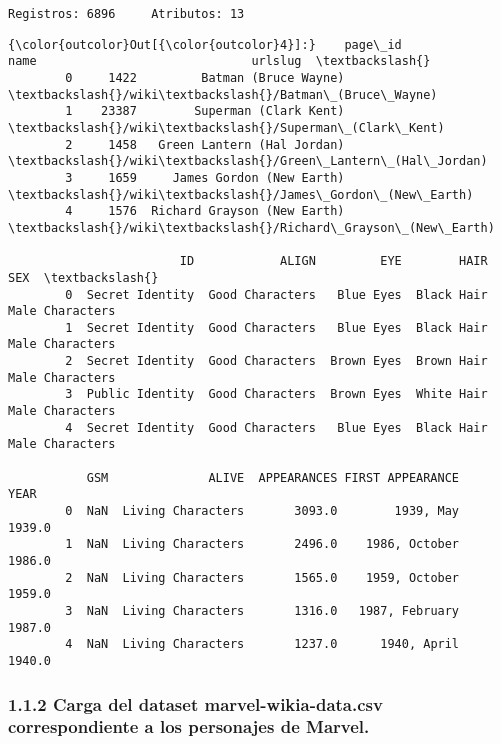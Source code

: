 \documentclass[11pt]{article}
\begin{document}
    \begin{Verbatim}[commandchars=\\\{\}]
Registros: 6896     Atributos: 13

    \end{Verbatim}

\begin{Verbatim}[commandchars=\\\{\}]
{\color{outcolor}Out[{\color{outcolor}4}]:}    page\_id                         name                              urlslug  \textbackslash{}
        0     1422         Batman (Bruce Wayne)         \textbackslash{}/wiki\textbackslash{}/Batman\_(Bruce\_Wayne)   
        1    23387        Superman (Clark Kent)        \textbackslash{}/wiki\textbackslash{}/Superman\_(Clark\_Kent)   
        2     1458   Green Lantern (Hal Jordan)   \textbackslash{}/wiki\textbackslash{}/Green\_Lantern\_(Hal\_Jordan)   
        3     1659     James Gordon (New Earth)     \textbackslash{}/wiki\textbackslash{}/James\_Gordon\_(New\_Earth)   
        4     1576  Richard Grayson (New Earth)  \textbackslash{}/wiki\textbackslash{}/Richard\_Grayson\_(New\_Earth)   
        
                        ID            ALIGN         EYE        HAIR              SEX  \textbackslash{}
        0  Secret Identity  Good Characters   Blue Eyes  Black Hair  Male Characters   
        1  Secret Identity  Good Characters   Blue Eyes  Black Hair  Male Characters   
        2  Secret Identity  Good Characters  Brown Eyes  Brown Hair  Male Characters   
        3  Public Identity  Good Characters  Brown Eyes  White Hair  Male Characters   
        4  Secret Identity  Good Characters   Blue Eyes  Black Hair  Male Characters   
        
           GSM              ALIVE  APPEARANCES FIRST APPEARANCE    YEAR  
        0  NaN  Living Characters       3093.0        1939, May  1939.0  
        1  NaN  Living Characters       2496.0    1986, October  1986.0  
        2  NaN  Living Characters       1565.0    1959, October  1959.0  
        3  NaN  Living Characters       1316.0   1987, February  1987.0  
        4  NaN  Living Characters       1237.0      1940, April  1940.0  
\end{Verbatim}
            
    \subsubsection{1.1.2 Carga del dataset marvel-wikia-data.csv
correspondiente a los personajes de
Marvel.}\label{carga-del-dataset-marvel-wikia-data.csv-correspondiente-a-los-personajes-de-marvel.}
\end{document}

